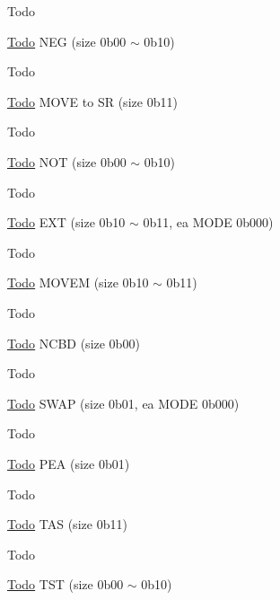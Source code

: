 \begin{DoxyRefDesc}{Todo}
\item[\hyperlink{todo__todo000037}{Todo}]N\-E\-G (size 0b00 $\sim$ 0b10) \end{DoxyRefDesc}


\begin{DoxyRefDesc}{Todo}
\item[\hyperlink{todo__todo000038}{Todo}]M\-O\-V\-E to S\-R (size 0b11) \end{DoxyRefDesc}


\begin{DoxyRefDesc}{Todo}
\item[\hyperlink{todo__todo000039}{Todo}]N\-O\-T (size 0b00 $\sim$ 0b10) \end{DoxyRefDesc}


\begin{DoxyRefDesc}{Todo}
\item[\hyperlink{todo__todo000040}{Todo}]E\-X\-T (size 0b10 $\sim$ 0b11, ea M\-O\-D\-E 0b000) \end{DoxyRefDesc}


\begin{DoxyRefDesc}{Todo}
\item[\hyperlink{todo__todo000041}{Todo}]M\-O\-V\-E\-M (size 0b10 $\sim$ 0b11) \end{DoxyRefDesc}


\begin{DoxyRefDesc}{Todo}
\item[\hyperlink{todo__todo000042}{Todo}]N\-C\-B\-D (size 0b00) \end{DoxyRefDesc}


\begin{DoxyRefDesc}{Todo}
\item[\hyperlink{todo__todo000043}{Todo}]S\-W\-A\-P (size 0b01, ea M\-O\-D\-E 0b000) \end{DoxyRefDesc}


\begin{DoxyRefDesc}{Todo}
\item[\hyperlink{todo__todo000044}{Todo}]P\-E\-A (size 0b01) \end{DoxyRefDesc}


\begin{DoxyRefDesc}{Todo}
\item[\hyperlink{todo__todo000045}{Todo}]T\-A\-S (size 0b11) \end{DoxyRefDesc}


\begin{DoxyRefDesc}{Todo}
\item[\hyperlink{todo__todo000046}{Todo}]T\-S\-T (size 0b00 $\sim$ 0b10) \end{DoxyRefDesc}


